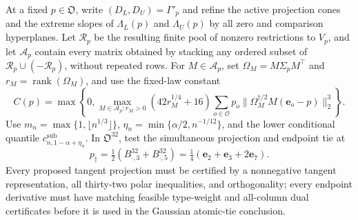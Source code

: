 At a fixed \(p\in\mathfrak O\), write \((D_L,D_U)=\Gamma'_p\) and refine the active projection cones and the extreme slopes of \(\Lambda_L(p)\) and \(\Lambda_U(p)\) by all zero and comparison hyperplanes.  Let \(\mathcal R_p\) be the resulting finite pool of nonzero restrictions to \(V_p\), and let \(\mathcal A_p\) contain every matrix obtained by stacking any ordered subset of \(\mathcal R_p\cup(-\mathcal R_p)\), without repeated rows.  For \(M\in\mathcal A_p\), set \(\Omega_M=M\Sigma_pM^{\top}\) and \(r_M=\operatorname{rank}(\Omega_M)\), and use the fixed-law constant
\[
C(p)=\max\left\{0,\max_{M\in\mathcal A_p:r_M>0}(42r_M^{1/4}+16)
\sum_{o\in\mathcal O}p_o\|\Omega_M^{\dagger/2}M(\mathbf e_o-p)\|_2^3\right\}.
\]
Use \(m_n=\max\{1,\lfloor n^{1/3}\rfloor\}\), \(\eta_n=\min\{\alpha/2,n^{-1/12}\}\), and the lower conditional quantile \(c^{\mathrm{sub}}_{n,1-\alpha+\eta_n}\).  In \(\mathfrak O^{32}\), test the simultaneous projection and endpoint tie at
\[
p_\dagger=\tfrac12(B^{32}_{\cdot,3}+B^{32}_{\cdot,5})
=\tfrac14(\mathbf e_2+\mathbf e_3+2\mathbf e_7).
\]
Every proposed tangent projection must be certified by a nonnegative tangent representation, all thirty-two polar inequalities, and orthogonality; every endpoint derivative must have matching feasible type-weight and all-column dual certificates before it is used in the Gaussian atomic-tie conclusion.